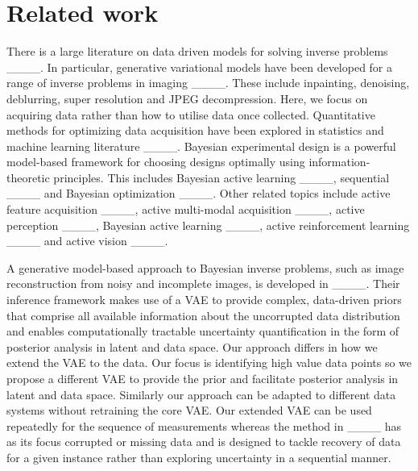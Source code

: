 \section{Related work}
There is a large literature on data driven models for solving inverse problems ____.
In particular, generative variational models have been developed for a range of inverse problems in imaging ____. These include inpainting, denoising, deblurring, super resolution and JPEG decompression. Here, we focus on acquiring data rather than how to utilise data once collected. 
Quantitative methods for optimizing data acquisition have been explored in statistics and machine learning literature ____. Bayesian experimental design is a powerful model-based framework for choosing designs optimally using information-theoretic principles. This includes Bayesian active learning ____, sequential ____ and Bayesian optimization ____. Other related topics include active feature acquisition ____, active multi-modal acquisition ____, active perception ____, Bayesian active learning ____, active reinforcement learning ____ and active vision ____.

A generative model-based approach to Bayesian inverse problems,
such as image reconstruction from noisy and incomplete images, is developed in ____. Their inference framework makes use of a VAE to provide complex, data-driven priors that comprise all available information about the uncorrupted data distribution and enables computationally tractable uncertainty
quantification in the form of posterior analysis in latent and data space. Our approach differs in how we extend the VAE to the data. Our focus is identifying high value data points so we propose a different VAE to provide the prior and facilitate posterior analysis in latent and data space. Similarly our approach can be adapted to different data systems without retraining the core VAE. Our extended VAE can be used repeatedly for the sequence of measurements whereas the method in ____ has as its focus corrupted or missing data and is designed to tackle recovery of data for a given instance rather than exploring uncertainty in a sequential manner.

